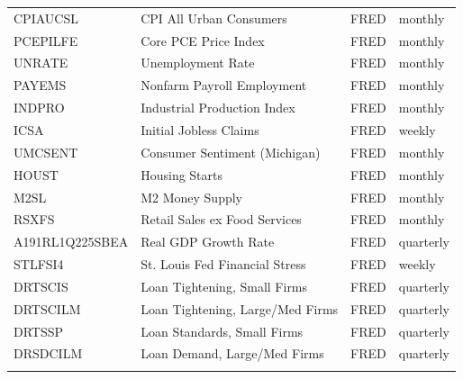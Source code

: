 \begin{table}[htbp]
\begin{tabular}{llll}
\quad CPIAUCSL & CPI All Urban Consumers & FRED & monthly \\
\quad PCEPILFE & Core PCE Price Index & FRED & monthly \\
\quad UNRATE & Unemployment Rate & FRED & monthly \\
\quad PAYEMS & Nonfarm Payroll Employment & FRED & monthly \\
\quad INDPRO & Industrial Production Index & FRED & monthly \\
\quad ICSA & Initial Jobless Claims & FRED & weekly \\
\quad UMCSENT & Consumer Sentiment (Michigan) & FRED & monthly \\
\quad HOUST & Housing Starts & FRED & monthly \\
\quad M2SL & M2 Money Supply & FRED & monthly \\
\quad RSXFS & Retail Sales ex Food Services & FRED & monthly \\
\quad A191RL1Q225SBEA & Real GDP Growth Rate & FRED & quarterly \\
\quad STLFSI4 & St. Louis Fed Financial Stress & FRED & weekly \\
\quad DRTSCIS & Loan Tightening, Small Firms & FRED & quarterly \\
\quad DRTSCILM & Loan Tightening, Large/Med Firms & FRED & quarterly \\
\quad DRTSSP & Loan Standards, Small Firms & FRED & quarterly \\
\quad DRSDCILM & Loan Demand, Large/Med Firms & FRED & quarterly \\
\addlinespace[2pt]
\midrule
\multicolumn{4}{l}{\textbf{Total: 56 variables}} \\
\bottomrule
\end{tabular}
\end{table}